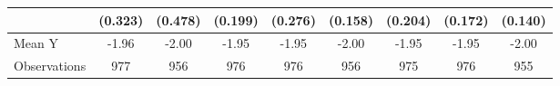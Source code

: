 {\begin{tabular}{l*{8}{c}}
            &     (0.323)         &     (0.478)         &     (0.199)         &     (0.276)         &     (0.158)         &     (0.204)         &     (0.172)         &     (0.140)         \\
\midrule
Mean Y      &       -1.96         &       -2.00         &       -1.95         &       -1.95         &       -2.00         &       -1.95         &       -1.95         &       -2.00         \\
Observations&         977         &         956         &         976         &         976         &         956         &         975         &         976         &         955         \\
\bottomrule
\end{tabular}
}
